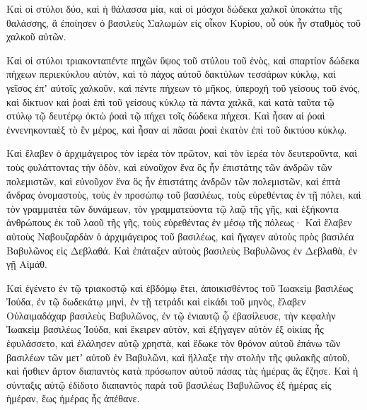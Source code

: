 {Καὶ οἱ στύλοι δύο, καὶ ἡ θάλασσα μία, καὶ οἱ μόσχοι δώδεκα χαλκοῖ ὑποκάτω τῆς θαλάσσης, ἃ ἐποίησεν ὁ βασιλεὺς Σαλωμὼν εἰς οἶκον Κυρίου, οὗ οὐκ ἦν σταθμὸς τοῦ χαλκοῦ αὐτῶν.
\par }{\PP {}Καὶ οἱ στύλοι τριακονταπέντε πηχῶν ὕψος τοῦ στύλου τοῦ ἑνὸς, καὶ σπαρτίον δώδεκα πήχεων περιεκύκλου αὐτὸν, καὶ τὸ πάχος αὐτοῦ δακτύλων τεσσάρων κύκλῳ,
καὶ γεῖσος ἐπʼ αὐτοῖς χαλκοῦν, καὶ πέντε πήχεων τὸ μῆκος, ὑπεροχὴ τοῦ γείσους τοῦ ἑνός, καὶ δίκτυον καὶ ῥοαὶ ἐπὶ τοῦ γείσους κύκλῳ τὰ πάντα χαλκᾶ, καὶ κατὰ ταῦτα τῷ στύλῳ τῷ δευτέρῳ ὀκτὼ ῥοαὶ τῷ πήχει τοῖς δώδεκα πήχεσι.
Καὶ ἦσαν αἱ ῥοαὶ ἐννενηκονταὲξ τὸ ἓν μέρος, καὶ ἦσαν αἱ πᾶσαι ῥοαὶ ἑκατὸν ἐπὶ τοῦ δικτύου κύκλῳ.
\par }{\PP {}Καὶ ἔλαβεν ὁ ἀρχιμάγειρος τὸν ἱερέα τὸν πρῶτον, καὶ τὸν ἱερέα τὸν δευτεροῦντα, καὶ τοὺς φυλάττοντας τὴν ὁδὸν,
καὶ εὐνοῦχον ἕνα ὃς ἦν ἐπιστάτης τῶν ἀνδρῶν τῶν πολεμιστῶν, καὶ εὐνοῦχον ἕνα ὃς ἦν ἐπιστάτης ἀνδρῶν τῶν πολεμιστῶν, καὶ ἑπτὰ ἄνδρας ὀνομαστοὺς, τοὺς ἐν προσώπῳ τοῦ βασιλέως, τοὺς εὑρεθέντας ἐν τῇ πόλει, καὶ τὸν γραμματέα τῶν δυνάμεων, τὸν γραμματεύοντα τῷ λαῷ τῆς γῆς, καὶ ἑξήκοντα ἀνθρώπους ἐκ τοῦ λαοῦ τῆς γῆς, τοὺς εὑρεθέντας ἐν μέσῳ τῆς πόλεως·
Καὶ ἔλαβεν αὐτοὺς Ναβουζαρδὰν ὁ ἀρχιμάγειρος τοῦ βασιλέως, καὶ ἤγαγεν αὐτοὺς πρὸς βασιλέα Βαβυλῶνος εἰς Δεβλαθά.
Καὶ ἐπάταξεν αὐτοὺς βασιλεὺς Βαβυλῶνος ἐν Δεβλαθὰ, ἐν γῇ Αἱμάθ.
\par }{\PP {}Καὶ ἐγένετο ἐν τῷ τριακοστῷ καὶ ἑβδόμῳ ἔτει, ἀποικισθέντος τοῦ Ἰωακεὶμ βασιλέως Ἰούδα, ἐν τῷ δωδεκάτῳ μηνὶ, ἐν τῇ τετράδι καὶ εἰκάδι τοῦ μηνὸς, ἔλαβεν Οὐλαιμαδάχαρ βασιλεὺς Βαβυλῶνος, ἐν τῷ ἐνιαυτῷ ᾧ ἐβασίλευσε, τὴν κεφαλὴν Ἰωακεὶμ βασιλέως Ἰούδα, καὶ ἔκειρεν αὐτὸν, καὶ ἐξήγαγεν αὐτὸν ἐξ οἰκίας ἧς ἐφυλάσσετο,
καὶ ἐλάλησεν αὐτῷ χρηστὰ, καὶ ἔδωκε τὸν θρόνον αὐτοῦ ἐπάνω τῶν βασιλέων τῶν μετʼ αὐτοῦ ἐν Βαβυλῶνι,
καὶ ἤλλαξε τὴν στολὴν τῆς φυλακῆς αὐτοῦ, καὶ ἤσθιεν ἄρτον διαπαντὸς κατὰ πρόσωπον αὐτοῦ πάσας τὰς ἡμέρας ἃς ἔζησε.
Καὶ ἡ σύνταξις αὐτῷ ἐδίδοτο διαπαντὸς παρὰ τοῦ βασιλέως Βαβυλῶνος ἐξ ἡμέρας εἰς ἡμέραν, ἕως ἡμέρας ἧς ἀπέθανε.
\par }
